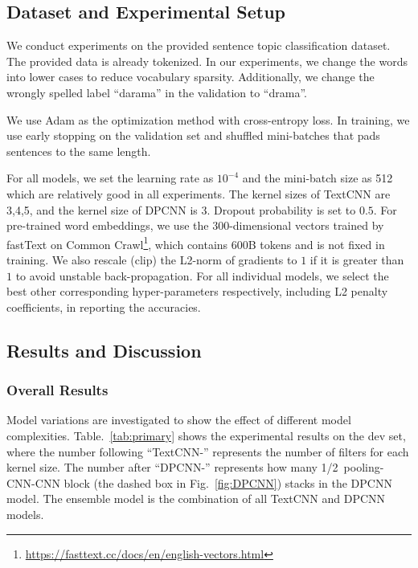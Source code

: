 \documentclass[11pt,letterpaper]{article}
\begin{document}
\subsection{Dataset and Experimental Setup}
    We conduct experiments on the provided sentence topic classification
    dataset. The provided data is already tokenized. In our experiments, we
    change the words into lower cases to reduce vocabulary sparsity. 
    Additionally, we change the wrongly spelled label ``darama'' in the 
    validation to ``drama''.

    We use Adam \cite{kingma2014adam} as the optimization method with 
    cross-entropy loss. In training, we use early stopping on the validation set 
    and shuffled mini-batches that pads sentences to the same length.

    For all models, we set the learning rate as $10^{-4}$ and the mini-batch 
    size as 512 which are relatively good in all experiments. The kernel sizes 
    of TextCNN are 3,4,5, and the kernel size of DPCNN is 3. Dropout 
    probability is set to $0.5$. For pre-trained word embeddings, we use the 
    300-dimensional vectors trained by fastText on Common 
    Crawl\footnote{\url{https://fasttext.cc/docs/en/english-vectors.html}}, 
    which contains 600B tokens and is not fixed in training. We also rescale 
    (clip) the L2-norm of gradients to $1$ if it is greater than $1$ to avoid 
    unstable back-propagation. For all individual models, we select the best 
    other corresponding hyper-parameters respectively, including L2 penalty 
    coefficients, in reporting the accuracies.

\subsection{Results and Discussion}
\subsubsection{Overall Results}
    Model variations are investigated to show the effect of different model 
    complexities. Table.~\ref{tab:primary} shows the experimental results on the
    dev set, where the number following ``TextCNN-'' represents the number of 
    filters for each kernel size. The number after ``DPCNN-'' represents how 
    many 1/2~pooling-CNN-CNN block (the dashed box in Fig.~\ref{fig:DPCNN}) 
    stacks in the DPCNN model. The ensemble model is the combination of all
    TextCNN and DPCNN models.
\end{document}
